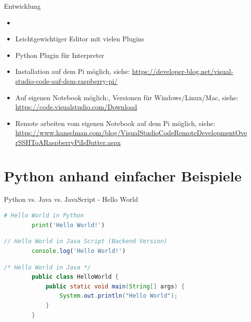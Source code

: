 \begin{frame}{Entwicklung}
    \begin{itemize}
        \setlength{\itemindent}{2.1in}
        \item [\textbf{ Entwicklung mit Visual Studio Code }]
    \end{itemize}

    \begin{itemize}
        \item Leichtgewichtiger Editor mit vielen Plugins
        \item Python Plugin für Interpreter
        \item Installation auf dem Pi möglich,  siehe: \url{https://developer-blog.net/visual-studio-code-auf-dem-raspberry-pi/}
        \item Auf eigenen Notebook möglich:, Versionen für Windows/Linux/Mac, siehe: \url{https://code.visualstudio.com/Download}
        \item Remote arbeiten vom eigenen Notebook auf dem Pi möglich, siehe: \url{https://www.hanselman.com/blog/VisualStudioCodeRemoteDevelopmentOverSSHToARaspberryPiIsButter.aspx}
     \end{itemize}
\end{frame}


\section{Python anhand einfacher Beispiele}

\begin{frame}[fragile]{Python vs. Java vs. JavaScript - Hello World}
    \begin{lstlisting}[language=Python, gobble=8]
        # Hello World in Python
        print('Hello World!')
    \end{lstlisting}
    \begin{lstlisting}[language=JavaScript, gobble=8]
        // Hello World in Java Script (Backend Version)
        console.log('Hello World!')
    \end{lstlisting}
    \begin{lstlisting}[language=Java, gobble=8]
        /* Hello World in Java */
        public class HelloWorld {
            public static void main(String[] args) {
                System.out.println("Hello World");
            }
        }
    \end{lstlisting}
\end{frame}

